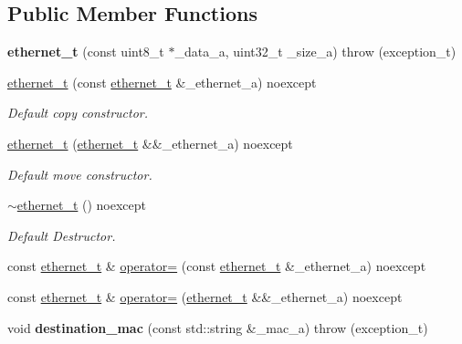 \subsection*{Public Member Functions}
\begin{DoxyCompactItemize}
\item 
\hypertarget{class_n_h_1_1_protocols_1_1_raw_1_1ethernet__t_ab1f6a4573a7109c43844b6d973982530}{{\bfseries ethernet\+\_\+t} (const uint8\+\_\+t $\ast$\+\_\+data\+\_\+a, uint32\+\_\+t \+\_\+size\+\_\+a)  throw (exception\+\_\+t)}\label{class_n_h_1_1_protocols_1_1_raw_1_1ethernet__t_ab1f6a4573a7109c43844b6d973982530}

\item 
\hyperlink{class_n_h_1_1_protocols_1_1_raw_1_1ethernet__t_aae968740cdec40877eaf40ac1ee38f46}{ethernet\+\_\+t} (const \hyperlink{class_n_h_1_1_protocols_1_1_raw_1_1ethernet__t}{ethernet\+\_\+t} \&\+\_\+ethernet\+\_\+a) noexcept
\begin{DoxyCompactList}\small\item\em Default copy constructor. \end{DoxyCompactList}\item 
\hyperlink{class_n_h_1_1_protocols_1_1_raw_1_1ethernet__t_ac8f8390dc2b6c9e6c505e3b47cab1391}{ethernet\+\_\+t} (\hyperlink{class_n_h_1_1_protocols_1_1_raw_1_1ethernet__t}{ethernet\+\_\+t} \&\&\+\_\+ethernet\+\_\+a) noexcept
\begin{DoxyCompactList}\small\item\em Default move constructor. \end{DoxyCompactList}\item 
\hyperlink{class_n_h_1_1_protocols_1_1_raw_1_1ethernet__t_a89f7515792e7284e30116a36b384204c}{$\sim$ethernet\+\_\+t} () noexcept
\begin{DoxyCompactList}\small\item\em Default Destructor. \end{DoxyCompactList}\item 
const \hyperlink{class_n_h_1_1_protocols_1_1_raw_1_1ethernet__t}{ethernet\+\_\+t} \& \hyperlink{class_n_h_1_1_protocols_1_1_raw_1_1ethernet__t_a9ed452b1a988282fc1493651f64c25d6}{operator=} (const \hyperlink{class_n_h_1_1_protocols_1_1_raw_1_1ethernet__t}{ethernet\+\_\+t} \&\+\_\+ethernet\+\_\+a) noexcept
\item 
const \hyperlink{class_n_h_1_1_protocols_1_1_raw_1_1ethernet__t}{ethernet\+\_\+t} \& \hyperlink{class_n_h_1_1_protocols_1_1_raw_1_1ethernet__t_a676007a7bf05fd45b18c65264e9871c0}{operator=} (\hyperlink{class_n_h_1_1_protocols_1_1_raw_1_1ethernet__t}{ethernet\+\_\+t} \&\&\+\_\+ethernet\+\_\+a) noexcept
\item 
\hypertarget{class_n_h_1_1_protocols_1_1_raw_1_1ethernet__t_ae1e8a0c3f497b5e83ac7f8ea8718a385}{void {\bfseries destination\+\_\+mac} (const std\+::string \&\+\_\+mac\+\_\+a)  throw (exception\+\_\+t)}\label{class_n_h_1_1_protocols_1_1_raw_1_1ethernet__t_ae1e8a0c3f497b5e83ac7f8ea8718a385}


\end{DoxyCompactItemize}
